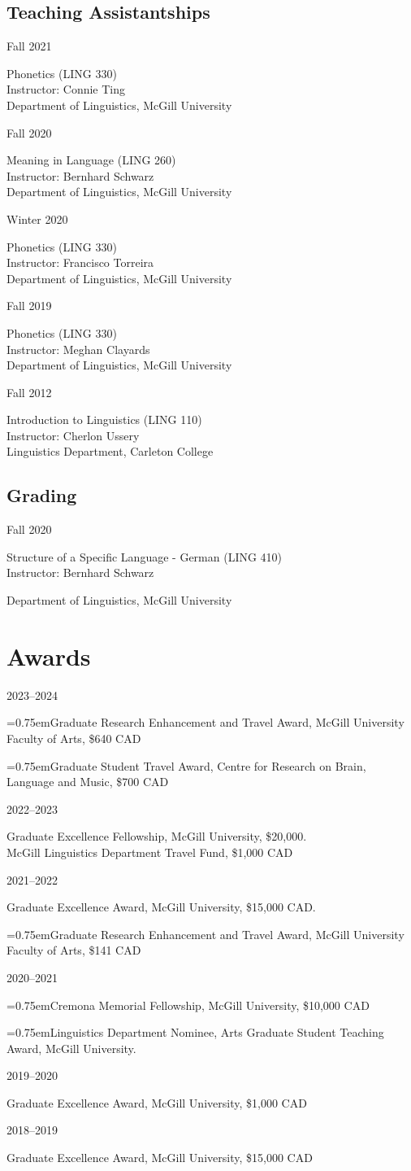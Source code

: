 \documentclass[11pt,oneside,DIV=8,parskip=off,letterpaper]{scrarticle} %
\newlength{\leftcolwidth}
\newlength{\mycolspace}
\newlength{\rightcolwidth}
\newlength{\spacingbefore}
\newlength{\spacingafter}
\newcommand{\hang}{\hangindent=0.75em\hangafter=1}
\newcommand{\mytwocol}[2]{%
	\vspace{\spacingbefore}%
	\begin{minipage}[t]{\leftcolwidth}%
		\strut#1%
	\end{minipage}%
	\hspace{\mycolspace}%
	\begin{minipage}[t]{\rightcolwidth}%
		\strut#2%
	\end{minipage}%
	\vspace{\spacingafter}\par%
	}
\newcommand{\cvline}[2]{%
	\mytwocol{#1}{#2}%
	}
\begin{document}
\subsection{Teaching Assistantships}
\cvline{Fall 2021}{%
	Phonetics (LING 330)\\
	Instructor: Connie Ting\\
	Department of Linguistics, McGill University}
\cvline{Fall 2020}{%
	Meaning in Language (LING 260)\\
	Instructor: Bernhard Schwarz\\
	Department of Linguistics, McGill University}
\cvline{Winter 2020}{%
	Phonetics (LING 330)\\
	Instructor: Francisco Torreira\\
	Department of Linguistics, McGill University}
\cvline{Fall 2019}{%
	Phonetics (LING 330)\\
	Instructor: Meghan Clayards\\
	Department of Linguistics, McGill University}
\cvline{Fall 2012}{%
	Introduction to Linguistics (LING 110)\\
	Instructor: Cherlon Ussery\\
	Linguistics Department, Carleton College}

\subsection{Grading}
\cvline{Fall 2020}{%
	Structure of a Specific Language - German (LING 410)\\
	Instructor: Bernhard Schwarz\par
	Department of Linguistics, McGill University}

\section{Awards}

\cvline{2023--2024}{\hang Graduate Research Enhancement and Travel Award, McGill University Faculty of Arts, \$640 CAD\par \hang Graduate Student Travel Award, Centre for Research on Brain, Language and Music, \$700 CAD}
\cvline{2022--2023}{Graduate Excellence Fellowship, McGill University, \$20,000.\\McGill Linguistics Department Travel Fund, \$1,000 CAD}
\cvline{2021--2022}{Graduate Excellence Award, McGill University, \$15,000 CAD.\par \hang Graduate Research Enhancement and Travel Award, McGill University Faculty of Arts, \$141 CAD}
\cvline{2020--2021}{\hang Cremona Memorial Fellowship, McGill University, \$10,000 CAD\par \hang Linguistics Department Nominee, Arts Graduate Student Teaching Award, McGill University.}
\cvline{2019--2020}{Graduate Excellence Award, McGill University, \$1,000 CAD}
\cvline{2018--2019}{Graduate Excellence Award, McGill University, \$15,000 CAD}
\end{document}
